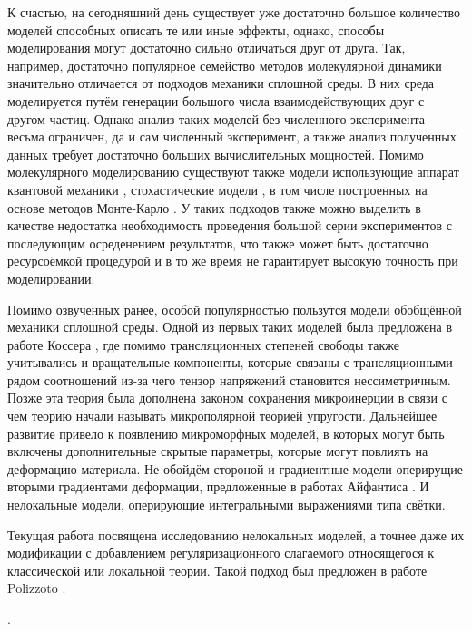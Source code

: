 К счастью, на сегодняшний день существует уже достаточно большое количество моделей способных описать те или иные эффекты, однако, способы моделирования могут достаточно сильно отличаться друг от друга. Так, например, достаточно популярное семейство методов молекулярной динамики значительно отличается от подходов механики сплошной среды. В них среда моделируется путём генерации большого числа взаимодействующих друг с другом частиц. Однако анализ таких моделей без численного эксперимента весьма ограничен, да и сам численный эксперимент, а также анализ полученных данных требует достаточно больших вычислительных мощностей. Помимо молекулярного моделированию существуют также модели использующие аппарат квантовой механики \cite{QuantumModelling1, QuantumModelling2}, стохастические модели \cite{Stohastic1, Stohastic2}, в том числе построенных на основе методов Монте-Карло \cite{MonteCarlo1, MonteCarlo2}. У таких подходов также можно выделить в качестве недостатка необходимость проведения большой серии экспериментов с последующим осреденением результатов, что также может быть достаточно ресурсоёмкой процедурой и в то же время не гарантирует высокую точность при моделировании.

Помимо озвученных ранее, особой популярностью пользутся модели обобщённой механики сплошной среды. Одной из первых таких моделей была предложена в работе Коссера \cite{Cosserat}, где помимо трансляционных степеней свободы также учитывались и вращательные компоненты, которые связаны с трансляционными рядом соотношений из-за чего тензор напряжений становится нессиметричным. Позже эта теория была дополнена законом сохранения микроинерции в связи с чем теорию начали называть микрополярной теорией упругости. Дальнейшее развитие привело к появлению микроморфных моделей, в которых могут быть включены дополнительные скрытые параметры, которые могут повлиять на деформацию материала. Не обойдём стороной и градиентные модели оперирущие вторыми градиентами деформации, предложенные в работах Айфантиса \cite{GradientModels}. И нелокальные модели, оперирующие интегральными выражениями типа свётки.

Текущая работа посвящена исследованию нелокальных моделей, а точнее даже их модификации с добавлением регуляризационного слагаемого относящегося к классической или локальной теории. Такой подход был предложен в работе Polizzoto \cite{Polizzotto1}.

\cite{SaintVenant}.

